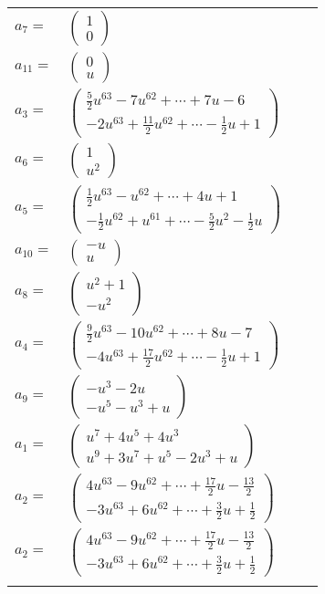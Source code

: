 \documentclass[1p]{elsarticle_modified}
\theoremstyle{definition}
\begin{document}
\begin{tabular}{m{7pt} m{180pt} m{7pt} m{180pt} }
\flushright $a_{7}=$&$\begin{pmatrix}1\\0\end{pmatrix}$ \\
\flushright $a_{11}=$&$\begin{pmatrix}0\\u\end{pmatrix}$ \\
\flushright $a_{3}=$&$\begin{pmatrix}\frac{5}{2} u^{63}-7 u^{62}+\cdots+7 u-6\\-2 u^{63}+\frac{11}{2} u^{62}+\cdots-\frac{1}{2} u+1\end{pmatrix}$ \\
\flushright $a_{6}=$&$\begin{pmatrix}1\\u^2\end{pmatrix}$ \\
\flushright $a_{5}=$&$\begin{pmatrix}\frac{1}{2} u^{63}- u^{62}+\cdots+4 u+1\\-\frac{1}{2} u^{62}+u^{61}+\cdots-\frac{5}{2} u^2-\frac{1}{2} u\end{pmatrix}$ \\
\flushright $a_{10}=$&$\begin{pmatrix}- u\\u\end{pmatrix}$ \\
\flushright $a_{8}=$&$\begin{pmatrix}u^2+1\\- u^2\end{pmatrix}$ \\
\flushright $a_{4}=$&$\begin{pmatrix}\frac{9}{2} u^{63}-10 u^{62}+\cdots+8 u-7\\-4 u^{63}+\frac{17}{2} u^{62}+\cdots-\frac{1}{2} u+1\end{pmatrix}$ \\
\flushright $a_{9}=$&$\begin{pmatrix}- u^3-2 u\\- u^5- u^3+u\end{pmatrix}$ \\
\flushright $a_{1}=$&$\begin{pmatrix}u^7+4 u^5+4 u^3\\u^9+3 u^7+u^5-2 u^3+u\end{pmatrix}$ \\
\flushright $a_{2}=$&$\begin{pmatrix}4 u^{63}-9 u^{62}+\cdots+\frac{17}{2} u-\frac{13}{2}\\-3 u^{63}+6 u^{62}+\cdots+\frac{3}{2} u+\frac{1}{2}\end{pmatrix}$\\ \flushright $a_{2}=$&$\begin{pmatrix}4 u^{63}-9 u^{62}+\cdots+\frac{17}{2} u-\frac{13}{2}\\-3 u^{63}+6 u^{62}+\cdots+\frac{3}{2} u+\frac{1}{2}\end{pmatrix}$\\&\end{tabular}
\end{document}
